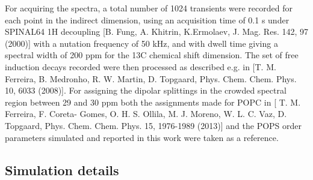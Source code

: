 \documentclass[journal=jpcbfk,manuscript=article]{achemso}
\begin{document}
For acquiring the spectra, a total number of 1024 transients were recorded for each point in the indirect dimension, using an acquisition time of 0.1 s under SPINAL64 1H decoupling [B. Fung, A. Khitrin, K.Ermolaev, J. Mag. Res. 142, 97 (2000)] with a nutation frequency of 50 kHz, and with dwell time giving a spectral width of 200 ppm for the 13C chemical shift dimension. The set of free induction decays recorded were then processed as described e.g. in [T. M. Ferreira, B. Medronho, R. W. Martin, D. Topgaard, Phys. Chem. Chem. Phys. 10, 6033 (2008)]. For assigning the dipolar splittings in the crowded spectral region between 29 and 30 ppm both the assignments made for POPC in [ T. M. Ferreira, F. Coreta- Gomes, O. H. S. Ollila, M. J. Moreno, W. L. C. Vaz, D. Topgaard, Phys. Chem. Chem. Phys. 15, 1976-1989 (2013)] and the POPS order parameters simulated and reported in this work were taken as a reference. 
 
\subsection{Simulation details} 
\end{document}
